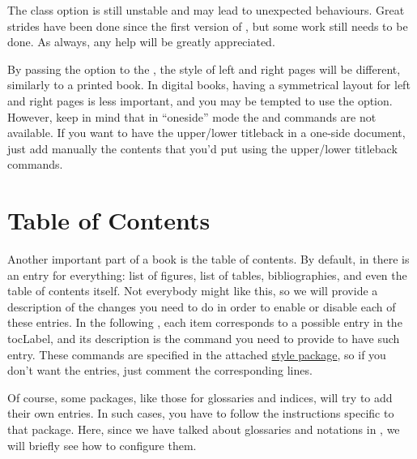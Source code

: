 \begin{kaobox}[frametitle=To Do]
The  class option is still unstable and may lead to 
unexpected behaviours. Great strides have been done since the first 
version of , but some work still needs to be done. As 
always, any help will be greatly appreciated.
\end{kaobox}

By passing the  option to the , the
style of left and right pages will be different, similarly to a
printed book. In digital books, having a symmetrical layout for
left and right pages is less important, and you may be tempted
to use the  option. However, keep in mind
that in \enquote{oneside} mode the  and
 commands are not available. If you want to have 
the upper/lower titleback in a one-side document, just add manually the 
contents that you'd put using the upper/lower titleback commands.

\section{Table of Contents}

Another important part of a book is the table of contents. By default, 
in  there is an entry for everything: list of figures, 
list of tables, bibliographies, and even the table of contents itself. 
Not everybody might like this, so we will provide a description of the 
changes you need to do in order to enable or disable each of these 
entries. In the following , each item corresponds to 
a possible entry in the \acrshort{tocLabel}, and its description is the 
command you need to provide to have such entry. These commands are 
specified in the attached \href{style/style.sty}{style 
package}, so if you don't want the entries, just comment the 
corresponding lines.

Of course, some packages, like those for glossaries and indices, will 
try to add their own entries. In such cases, you have to follow the 
instructions specific to that package. Here, since we have talked about 
glossaries and notations in , we will briefly see how
to configure them.

